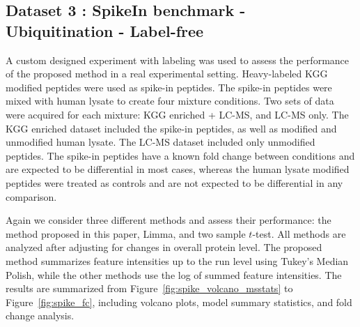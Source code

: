 \documentclass{mcp}
\def\sfigref#1{{Figure~\ref{#1}}}
\begin{document}
\clearpage
\subsection{Dataset 3 : SpikeIn benchmark - Ubiquitination - Label-free}
\label{sec:benchmark}

A custom designed experiment with labeling was used to assess the performance of the proposed method in a real experimental setting. Heavy-labeled KGG modified peptides were used as spike-in peptides. The spike-in peptides were mixed with human lysate to create four mixture conditions. Two sets of data were acquired for each mixture: KGG enriched + LC-MS, and LC-MS only. The KGG enriched dataset included the spike-in peptides, as well as modified and unmodified human lysate. The LC-MS dataset included only unmodified peptides. The spike-in peptides have a known fold change between conditions and are expected to be differential in most cases, whereas the human lysate modified peptides were treated as controls and are not expected to be differential in any comparison.

Again we consider three different methods and assess their performance: the method proposed in this paper, Limma, and two sample $t$-test. All methods are analyzed after adjusting for changes in overall protein level. The proposed method summarizes feature intensities up to the run level using Tukey's Median Polish, while the other methods use the log of summed feature intensities. The results are summarized from \sfigref{fig:spike_volcano_msstats} to \sfigref{fig:spike_fc}, including volcano plots, model summary statistics, and fold change analysis.
\end{document}
